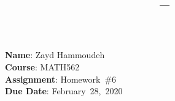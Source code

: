 \documentclass{report}
\title{\textbf{\course\ -- \assnName}}
\author{\name}
\newcommand{\name}{Zayd Hammoudeh}
\newcommand{\course}{MATH562}
\newcommand{\assnName}{Homework~\#6}
\newcommand{\dueDate}{February~28,~2020}
\begin{document}
  \maketitle

  \noindent
  \textbf{Name}: \name\\
  \textbf{Course}: \course\\
  \textbf{Assignment}: \assnName\\
  \textbf{Due Date}: \dueDate


  \newpage
  
  \newpage
  
  \newpage
  
  \newpage
  
  \newpage
  
  \newpage
  
  \newpage
  
  \newpage
  
  \newpage
  
  \newpage
  
  \newpage
  
\end{document}
